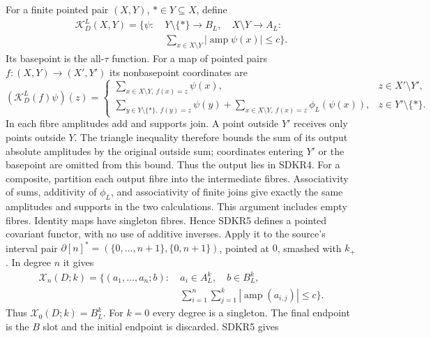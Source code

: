 For a finite pointed pair $(X,Y)$, $*\in Y\subseteq X$, define
\begin{equation}\tag{SDKR4}
\begin{split}
\mathcal K_D^L(X,Y)=\biggl\{\psi:\ &
Y\setminus\{*\}\to B_L,\quad X\setminus Y\to A_L:\\
&\sum_{x\in X\setminus Y}|\operatorname{amp}\psi(x)|\le c
\biggr\}.
\end{split}
\end{equation}
Its basepoint is the all-$\tau$ function. For a map of pointed
pairs $f:(X,Y)\to(X',Y')$ its nonbasepoint coordinates are
\begin{equation}\tag{SDKR5}
(\mathcal K_D^L(f)\psi)(z)=
\begin{cases}
\displaystyle\sum_{x\in X\setminus Y,\ f(x)=z}\psi(x),
                              &z\in X'\setminus Y',\\[4pt]
\displaystyle\sum_{y\in Y\setminus\{*\},\ f(y)=z}\psi(y)
+\displaystyle\sum_{x\in X\setminus Y,\ f(x)=z}\phi_L(\psi(x)),
                              &z\in Y'\setminus\{*\}.
\end{cases}
\end{equation}
In each fibre amplitudes add and supports join. A point outside
$Y'$ receives only points outside $Y$. The triangle inequality
therefore bounds the sum of its output absolute amplitudes by
the original outside sum; coordinates entering $Y'$ or the
basepoint are omitted from this bound. Thus the output lies in
SDKR4.
For a composite, partition each output fibre into the intermediate
fibres. Associativity of sums, additivity of $\phi_L$, and
associativity of finite joins give exactly the same amplitudes and
supports in the two calculations. This argument includes empty
fibres. Identity maps have singleton fibres. Hence SDKR5 defines
a pointed covariant functor, with no use of additive inverses.
Apply it to the source's interval pair
$\partial[n]^*=(\{0,\ldots,n+1\},\{0,n+1\})$, pointed at $0$,
smashed with $k_+$. In degree $n$ it gives
\begin{equation}\tag{SDKR6}
\begin{split}
\mathcal X_n(D;k)=\biggl\{(a_1,\ldots,a_n;b):\
&a_i\in A_L^k,\quad b\in B_L^k,\\
&\sum_{i=1}^n\sum_{j=1}^k
        |\operatorname{amp}(a_{i,j})|\le c\biggr\}.
\end{split}
\end{equation}
Thus $\mathcal X_0(D;k)=B_L^k$. For $k=0$ every degree is
a singleton. The final endpoint is the $B$ slot and the initial
endpoint is discarded. SDKR5 gives
